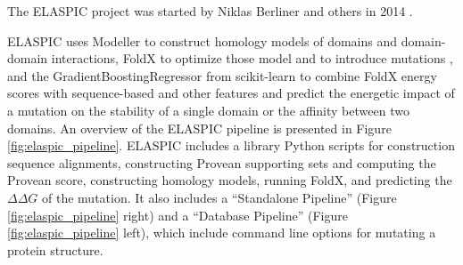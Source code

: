 The ELASPIC project was started by Niklas Berliner and others in 2014 \cite{berliner_combining_2014}.

ELASPIC uses Modeller \cite{webb_comparative_2002} to construct homology models of domains and domain-domain interactions, FoldX to optimize those model and to introduce mutations \cite{schymkowitz_foldx_2005}, and the GradientBoostingRegressor from scikit-learn \cite{scikit-learn} to combine FoldX energy scores with sequence-based and other features and predict the energetic impact of a mutation on the stability of a single domain or the affinity between two domains. An overview of the ELASPIC pipeline is presented in Figure \ref{fig:elaspic_pipeline}. ELASPIC includes a library Python scripts for construction sequence alignments, constructing Provean supporting sets and computing the Provean score, constructing homology models, running FoldX, and predicting the $\Delta \Delta G$ of the mutation. It also includes a ``Standalone Pipeline'' (Figure \ref{fig:elaspic_pipeline} right) and a ``Database Pipeline'' (Figure \ref{fig:elaspic_pipeline} left), which include command line options for mutating a protein structure.

